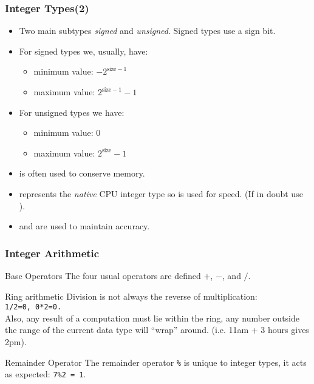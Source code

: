 \documentclass[smaller,table]{beamer} %
\begin{document}
\begin{frame}
\frametitle{Integer Types(2)}
\begin{itemize}
\item Two main subtypes \emph{signed} and \emph{unsigned}. Signed types use a sign bit.
\item For signed types we, usually, have:
\begin{itemize}
\item minimum value: $-2^{\textrm{size}-1}$
\item maximum value: $2^{\textrm{size}-1}-1$
\end{itemize}
\item For unsigned types we have:
\begin{itemize}
\item minimum value: $0$
\item maximum value: $2^{\textrm{size}}-1$
\end{itemize}
\item {} is often used to conserve memory.
\item {} represents the \emph{native} CPU integer type so is used for speed. (If in doubt use ).
\item {} and  are used to maintain accuracy.
\end{itemize}
\end{frame}

\begin{frame}
\frametitle{Integer Arithmetic}

\begin{block}{Base Operators}
The four usual operators are defined $+$, $-$, {\tt *} and $/$.
\end{block}

\begin{block}{Ring arithmetic}
Division is not always the reverse of multiplication:\\
{\tt 1/2=0,  0*2=0.}\\
Also, any result of a computation must lie within the ring, any number outside the range of the current data type will ``wrap'' around. (i.e. 11am + 3 hours gives 2pm).
\end{block}

\begin{block}{Remainder Operator}
The remainder operator {\tt\%} is unique to integer types, it acts as expected:
{\tt7\%2 = 1}.
\end{block}
\end{frame}
\end{document}
